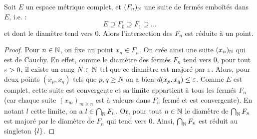 \begin{thm}
Soit $E$ un espace métrique complet, et $(F_n)_{\mathbb{N}}$ une suite de fermés emboîtés dans $E$, i.e. :
\[ E \supseteq F_0 \supseteq F_1 \supseteq \dots \]
et dont le diamètre tend vers 0. Alors l'intersection des $F_n$ est réduite à un point.
\end{thm}

\begin{proof}
Pour $n \in \mathbb{N}$, on fixe un point $x_n \in F_n$. On crée ainsi une suite $(x_n)_{\mathbb{N}}$ qui est de Cauchy.
En effet, comme le diamètre des fermés $F_n$ tend vers 0, pour tout $\varepsilon > 0$, il existe un rang $N \in \mathbb{N}$ tel que ce diamètre 
est majoré par $\varepsilon$. Alors, pour deux points $(x_p,x_q)$ tels que $p, q \geq N$ on a bien $d(x_p,x_q) \leq \varepsilon$.
Comme $E$ est complet, cette suite est convergente et sa limite appartient à tous les fermés $F_n$ 
(car chaque suite $(x_m)_{m \geq n}$ est à valeurs dans $F_n$ fermé et est convergente).
En notant $l$ cette limite, on a $l \in \bigcap_{\mathbb{N}} F_n$. 
Or, pour tout $n \in \mathbb{N}$ le diamètre de $\bigcap_{\mathbb{N}} F_n$ est majoré par le diamètre de $F_n$ qui tend vers 0.
Ainsi, $\bigcap_{\mathbb{N}} F_n$ est réduit au singleton $\{ l \}$.
\end{proof}

%

